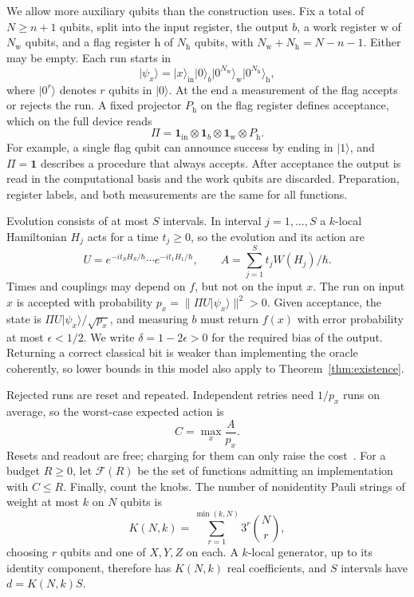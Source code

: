 \documentclass[11pt,a4paper]{article}
\providecommand{\openone}{\mathbf{1}}
\newcommand{\ket}[1]{\lvert #1\rangle}
\newcommand{\norm}[1]{\lVert #1\rVert}
\newcommand{\id}{\openone}
\begin{document}
We allow more auxiliary qubits than the construction uses. Fix a total of $N\ge n+1$ qubits, split into the input register, the output $b$, a work register $\mathrm w$ of $N_{\mathrm w}$ qubits, and a flag register $\mathrm h$ of $N_{\mathrm h}$ qubits, with $N_{\mathrm w}+N_{\mathrm h}=N-n-1$. Either may be empty. Each run starts in
\begin{equation}
 \ket{\psi_x}=\ket{x}_{\mathrm{in}}\ket0_b
              \ket{0^{N_{\mathrm w}}}_{\mathrm w}
              \ket{0^{N_{\mathrm h}}}_{\mathrm h},
\end{equation}
where $\ket{0^r}$ denotes $r$ qubits in $\ket0$. At the end a measurement of the flag accepts or rejects the run. A fixed projector $P_{\mathrm h}$ on the flag register defines acceptance, which on the full device reads
\begin{equation}
 \Pi=\id_{\mathrm{in}}\otimes\id_b\otimes\id_{\mathrm w}\otimes P_{\mathrm h}.
\end{equation}
For example, a single flag qubit can announce success by ending in $\ket1$, and $\Pi=\id$ describes a procedure that always accepts. After acceptance the output is read in the computational basis and the work qubits are discarded. Preparation, register labels, and both measurements are the same for all functions.

Evolution consists of at most $S$ intervals. In interval $j=1,\ldots,S$ a $k$-local Hamiltonian $H_j$ acts for a time $t_j\ge0$, so the evolution and its action are
\begin{equation}
 U=e^{-it_SH_S/\hbar}\cdots e^{-it_1H_1/\hbar},\qquad
 A=\sum_{j=1}^{S}t_jW(H_j)/\hbar.
\end{equation}
Times and couplings may depend on $f$, but not on the input $x$. The run on input $x$ is accepted with probability $p_x=\norm{\Pi U\ket{\psi_x}}^2>0$. Given acceptance, the state is $\Pi U\ket{\psi_x}/\sqrt{p_x}$, and measuring $b$ must return $f(x)$ with error probability at most $\epsilon<1/2$. We write $\delta=1-2\epsilon>0$ for the required bias of the output. Returning a correct classical bit is weaker than implementing the oracle coherently, so lower bounds in this model also apply to Theorem~\ref{thm:existence}.

Rejected runs are reset and repeated. Independent retries need $1/p_x$ runs on average, so the worst-case expected action is
\begin{equation}
 C=\max_x\frac{A}{p_x}.
\end{equation}
Resets and readout are free; charging for them can only raise the cost~\cite{Combes2015}. For a budget $R\ge0$, let $\mathcal F(R)$ be the set of functions admitting an implementation with $C\le R$. Finally, count the knobs. The number of nonidentity Pauli strings of weight at most $k$ on $N$ qubits is
\begin{equation}
 K(N,k)=\sum_{r=1}^{\min(k,N)}3^r\binom Nr,
\end{equation}
choosing $r$ qubits and one of $X,Y,Z$ on each. A $k$-local generator, up to its identity component, therefore has $K(N,k)$ real coefficients, and $S$ intervals have $d=K(N,k)S$.
\end{document}
